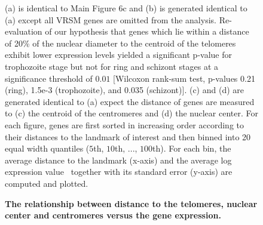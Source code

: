 \begin{figure}
  \begin{center}
  \hspace{0.05\textwidth}
  \hspace{0.05\textwidth}
  \hspace{0.05\textwidth}
   \end{center}
\caption{{\bf The relationship between distance to the telomeres, nuclear center and centromeres versus the gene expression.}}
{   (a) is identical to Main Figure 6c and (b) is generated identical to (a) except
    all VRSM genes are omitted from the analysis.
    Re-evaluation of our hypothesis that genes which lie within a distance of
    20\% of the nuclear diameter to the centroid of the telomeres exhibit lower expression
    levels yielded a significant p-value for trophozoite stage but not for ring and
    schizont stages at a significance threshold of $0.01$ [Wilcoxon rank-sum test,
    p-values 0.21 (ring), 1.5e-3 (trophozoite), and 0.035 (schizont)].
    (c) and (d) are generated identical to (a) expect the distance of genes are measured to
    (c) the centroid of the centromeres and (d) the nuclear center.
    For each figure, genes are first sorted in increasing order according to their distances
    to the landmark of interest and then binned into 20 equal width quantiles
    ($5$th, $10$th, ..., $100$th). For each bin, the average distance to the landmark (x-axis)
    and the average log expression value~\citep{bunnik:polysome} together with its standard
    error (y-axis) are computed and plotted.
}
\label{suppfig:distToCenter}
\end{figure}
\clearpage


